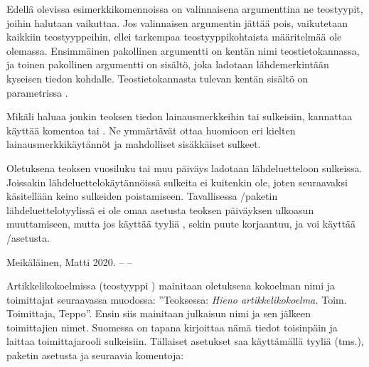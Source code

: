\begin{koodilohkosis}
\end{koodilohkosis}

Edellä olevissa esimerkkikomennoissa on valinnaisena argumenttina ne
teostyypit, joihin halutaan vaikuttaa. Jos valinnaisen argumentin jättää
pois, vaikutetaan kaikkiin teostyyppeihin, ellei tarkempaa
teostyyppikohtaista määritelmää ole olemassa. Ensimmäinen pakollinen
argumentti on kentän nimi teostietokannassa, ja toinen pakollinen
argumentti on sisältö, joka ladotaan lähdemerkintään kyseisen tiedon
kohdalle. Teostietokannasta tulevan kentän sisältö on parametrissa
.

Mikäli haluaa jonkin teoksen tiedon lainausmerkkeihin tai sulkeisiin,
kannattaa käyttää komentoa  tai . Ne ymmärtävät ottaa huomioon eri kielten
lainausmerkkikäytännöt ja mahdolliset sisäkkäiset sulkeet.

\begin{koodilohkosis}
\end{koodilohkosis}

Oletuksena teoksen vuosiluku tai muu päiväys ladotaan lähdeluetteloon
sulkeissa. Joissakin lähdeluettelokäytännöissä sulkeita ei kuitenkin
ole, joten seuraavaksi käsitellään keino sulkeiden poistamiseen.
Tavallisessa \-/paketin lähdeluettelotyylissä
 ei ole omaa asetusta teoksen päiväyksen ulkoasun
muuttamiseen, mutta jos käyttää tyyliä , sekin
puute korjaantuu, ja voi käyttää \-/asetusta.


\begin{koodilohkosis}
  \usepackage[style=ext-authoryear]{biblatex}

\end{koodilohkosis}

\begin{tulossis}
  Meikäläinen, Matti 2020. -- --
\end{tulossis}

Artikkelikokoelmissa (teostyyppi ) mainitaan
oletuksena kokoelman nimi ja toimittajat seuraavassa muodossa:
''Teoksessa: \emph{Hieno artikkelikokoelma.} Toim. Toimittaja, Teppo''.
Ensin siis mainitaan julkaisun nimi ja sen jälkeen toimittajien nimet.
Suomessa on tapana kirjoittaa nämä tiedot toisinpäin ja laittaa
toimittajarooli sulkeisiin. Tällaiset asetukset saa käyttämällä tyyliä
 (tms.), paketin asetusta
 ja seuraavia komentoja:

